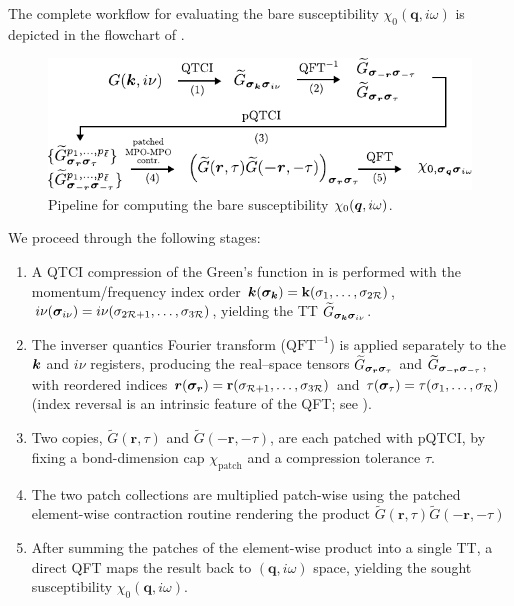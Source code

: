 The complete workflow for evaluating the bare susceptibility \(\chi_{0}(\mathbf q,i\omega)\) is depicted in the flowchart of .  


\begin{figure}[htbp]
    \centering
    \includegraphics{figures/bubbleFlowchart.pdf}
    \caption{Pipeline for computing the bare susceptibility \(\chi_{0}(\boldsymbol{q},i\omega)\).}
    \label{fig:bubbleFlowchart}
\end{figure}

We proceed through the following stages:

\begingroup
\renewcommand{\labelenumi}{(\arabic{enumi})}
\begin{enumerate}
    \item A QTCI compression of the Green’s function in  is performed with the momentum/frequency
    index order \(\boldsymbol{k}(\boldsymbol{\sigma}_{\boldsymbol{k}})=\mathbf k(\sigma_{1},\dots,\sigma_{2\mathcal R})\),
    \(i\nu(\boldsymbol{\sigma}_{i\nu})=i\nu(\sigma_{2\mathcal R+1},\dots,\sigma_{3\mathcal R})\), yielding the TT \(\widetilde G_{\boldsymbol{\sigma}_{\boldsymbol{k}}\boldsymbol{\sigma}_{i\nu}}\).
    \item The inverser quantics Fourier transform ($\text{QFT}^{-1}$) is applied separately to the \(\boldsymbol{k}\) and \(i\nu\) registers, producing the real–space tensors \(\widetilde G_{\boldsymbol{\sigma}_{\boldsymbol{r}}\boldsymbol{\sigma}_{\tau}}\) and \(\widetilde G_{\boldsymbol{\sigma}_{-\boldsymbol{r}}\boldsymbol{\sigma}_{-\tau}}\), with reordered indices \(\boldsymbol{r}(\boldsymbol{\sigma}_{\boldsymbol{r}})=\mathbf r(\sigma_{\mathcal R+1},\dots,\sigma_{3\mathcal R})\)
    and \(\tau(\boldsymbol{\sigma}_{\tau})=\tau(\sigma_{1},\dots,\sigma_{\mathcal R})\)
    (index reversal is an intrinsic feature of the QFT; see ).
    \item Two copies, \(\widetilde G(\mathbf r,\tau)\) and \(\widetilde G(-\mathbf r,-\tau)\), are each patched with pQTCI, by fixing a bond-dimension cap \(\chi_{\text{patch}}\) and a compression tolerance $\tau$. 
    \item The two patch collections are multiplied patch-wise using the patched element-wise contraction routine rendering the product \(\widetilde G(\mathbf r,\tau)\widetilde G(-\mathbf r,-\tau) \)
    \item After summing the patches of the element-wise product into a
    single TT, a direct QFT maps the result back to \((\mathbf q,i\omega)\)
    space, yielding the sought susceptibility
    \(\chi_{0}(\mathbf q,i\omega)\).
\end{enumerate}
\endgroup


